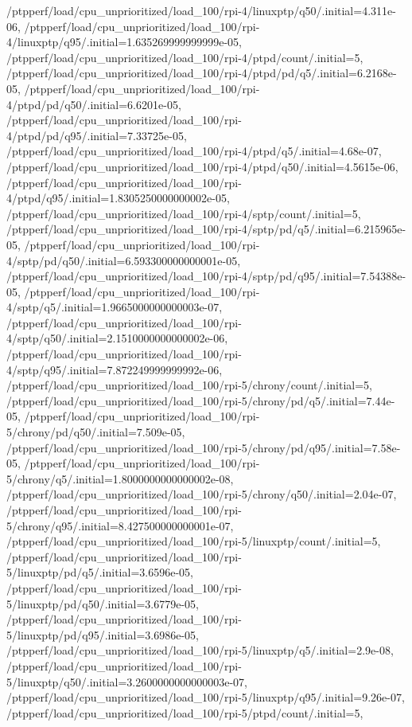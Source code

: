 {    /ptpperf/load/cpu_unprioritized/load_100/rpi-4/linuxptp/q50/.initial=4.311e-06,
    /ptpperf/load/cpu_unprioritized/load_100/rpi-4/linuxptp/q95/.initial=1.635269999999999e-05,
    /ptpperf/load/cpu_unprioritized/load_100/rpi-4/ptpd/count/.initial=5,
    /ptpperf/load/cpu_unprioritized/load_100/rpi-4/ptpd/pd/q5/.initial=6.2168e-05,
    /ptpperf/load/cpu_unprioritized/load_100/rpi-4/ptpd/pd/q50/.initial=6.6201e-05,
    /ptpperf/load/cpu_unprioritized/load_100/rpi-4/ptpd/pd/q95/.initial=7.33725e-05,
    /ptpperf/load/cpu_unprioritized/load_100/rpi-4/ptpd/q5/.initial=4.68e-07,
    /ptpperf/load/cpu_unprioritized/load_100/rpi-4/ptpd/q50/.initial=4.5615e-06,
    /ptpperf/load/cpu_unprioritized/load_100/rpi-4/ptpd/q95/.initial=1.8305250000000002e-05,
    /ptpperf/load/cpu_unprioritized/load_100/rpi-4/sptp/count/.initial=5,
    /ptpperf/load/cpu_unprioritized/load_100/rpi-4/sptp/pd/q5/.initial=6.215965e-05,
    /ptpperf/load/cpu_unprioritized/load_100/rpi-4/sptp/pd/q50/.initial=6.593300000000001e-05,
    /ptpperf/load/cpu_unprioritized/load_100/rpi-4/sptp/pd/q95/.initial=7.54388e-05,
    /ptpperf/load/cpu_unprioritized/load_100/rpi-4/sptp/q5/.initial=1.9665000000000003e-07,
    /ptpperf/load/cpu_unprioritized/load_100/rpi-4/sptp/q50/.initial=2.1510000000000002e-06,
    /ptpperf/load/cpu_unprioritized/load_100/rpi-4/sptp/q95/.initial=7.872249999999992e-06,
    /ptpperf/load/cpu_unprioritized/load_100/rpi-5/chrony/count/.initial=5,
    /ptpperf/load/cpu_unprioritized/load_100/rpi-5/chrony/pd/q5/.initial=7.44e-05,
    /ptpperf/load/cpu_unprioritized/load_100/rpi-5/chrony/pd/q50/.initial=7.509e-05,
    /ptpperf/load/cpu_unprioritized/load_100/rpi-5/chrony/pd/q95/.initial=7.58e-05,
    /ptpperf/load/cpu_unprioritized/load_100/rpi-5/chrony/q5/.initial=1.8000000000000002e-08,
    /ptpperf/load/cpu_unprioritized/load_100/rpi-5/chrony/q50/.initial=2.04e-07,
    /ptpperf/load/cpu_unprioritized/load_100/rpi-5/chrony/q95/.initial=8.427500000000001e-07,
    /ptpperf/load/cpu_unprioritized/load_100/rpi-5/linuxptp/count/.initial=5,
    /ptpperf/load/cpu_unprioritized/load_100/rpi-5/linuxptp/pd/q5/.initial=3.6596e-05,
    /ptpperf/load/cpu_unprioritized/load_100/rpi-5/linuxptp/pd/q50/.initial=3.6779e-05,
    /ptpperf/load/cpu_unprioritized/load_100/rpi-5/linuxptp/pd/q95/.initial=3.6986e-05,
    /ptpperf/load/cpu_unprioritized/load_100/rpi-5/linuxptp/q5/.initial=2.9e-08,
    /ptpperf/load/cpu_unprioritized/load_100/rpi-5/linuxptp/q50/.initial=3.2600000000000003e-07,
    /ptpperf/load/cpu_unprioritized/load_100/rpi-5/linuxptp/q95/.initial=9.26e-07,
    /ptpperf/load/cpu_unprioritized/load_100/rpi-5/ptpd/count/.initial=5,
}
